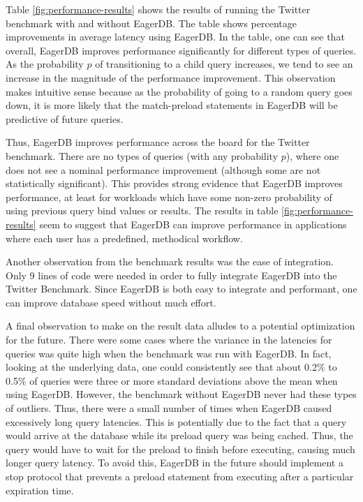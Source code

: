 \documentclass[12pt]{article}
\begin{document}
Table \ref{fig:performance-results} shows the results of running the Twitter benchmark with and without EagerDB. The table shows percentage improvements in average latency using EagerDB. In the table, one can see that overall, EagerDB improves performance significantly for different types of queries. As the probability $p$ of transitioning to a child query increases, we tend to see an increase in the magnitude of the performance improvement. This observation makes intuitive sense because as the probability of going to a random query goes down, it is more likely that the match-preload statements in EagerDB will be predictive of future queries.

Thus, EagerDB improves performance across the board for the Twitter benchmark. There are no types of queries (with any probability $p$), where one does not see a nominal performance improvement (although some are not statistically significant). This provides strong evidence that EagerDB improves performance, at least for workloads which have some non-zero probability of using previous query bind values or results. The results in table \ref{fig:performance-results} seem to suggest that EagerDB can improve performance in applications where each user has a predefined, methodical workflow.

Another observation from the benchmark results was the ease of integration. Only 9 lines of code were needed in order to fully integrate EagerDB into the Twitter Benchmark. Since EagerDB is both easy to integrate and performant, one can improve database speed without much effort.

A final observation to make on the result data alludes to a potential optimization for the future. There were some cases where the variance in the latencies for queries was quite high when the benchmark was run with EagerDB. In fact, looking at the underlying data, one could consistently see that about 0.2\% to 0.5\% of queries were three or more standard deviations above the mean when using EagerDB. However, the benchmark without EagerDB never had these types of outliers. Thus, there were a small number of times when EagerDB caused excessively long query latencies. This is potentially due to the fact that a query would arrive at the database while its preload query was being cached. Thus, the query would have to wait for the preload to finish before executing, causing much longer query latency. To avoid this, EagerDB in the future should implement a stop protocol that prevents a preload statement from executing after a particular expiration time.
\end{document}
